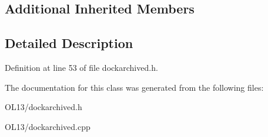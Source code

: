 \subsection*{Additional Inherited Members}


\subsection{Detailed Description}


Definition at line 53 of file dockarchived.\+h.



The documentation for this class was generated from the following files\+:\begin{DoxyCompactItemize}
\item 
O\+L13/dockarchived.\+h\item 
O\+L13/dockarchived.\+cpp\end{DoxyCompactItemize}
